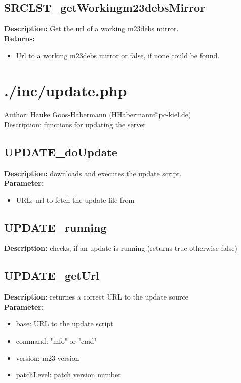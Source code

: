 \subsection{SRCLST\_getWorkingm23debsMirror}
\textbf{Description:} Get the url of a working m23debs mirror.\\
\textbf{Returns:}
\begin{itemize}
\item Url to a working m23debs mirror or false, if none could be found.
\end{itemize}

\newpage\section{./inc/update.php}
 Author: Hauke Goos-Habermann (HHabermann@pc-kiel.de)\\
 Description: functions for updating the server\\

\subsection{UPDATE\_doUpdate}
\textbf{Description:} downloads and executes the update script.\\
\textbf{Parameter:}
\begin{itemize}
\item URL: url to fetch the update file from
\end{itemize}

\subsection{UPDATE\_running}
\textbf{Description:} checks, if an update is running (returns true otherwise false)\\

\subsection{UPDATE\_getUrl}
\textbf{Description:} returnes a correct URL to the update source\\
\textbf{Parameter:}
\begin{itemize}
\item base: URL to the update script
\item command: "info" or "cmd"
\item version: m23 version
\item patchLevel: patch version number
\end{itemize}

